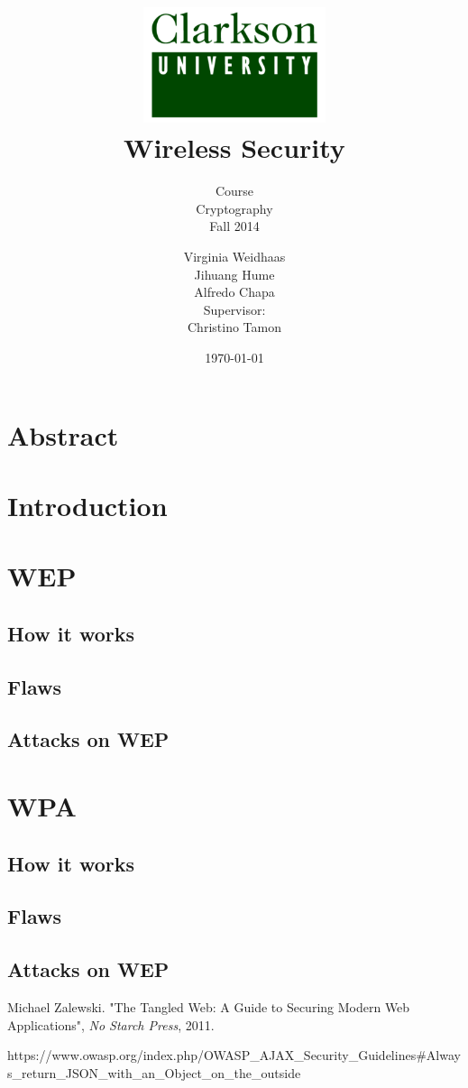 \documentclass[a4paper,12pt,pagesize,headsepline,bibtotoc,titlepage]{scrartcl}
\title{
	\includegraphics*[width=0.4\textwidth]{clarkson.png}\\
	\vspace{24pt}
	Wireless Security
}
\subtitle{
	Course\\
	Cryptography\\
	Fall 2014
}
\author{
	Virginia Weidhaas\\[12pt]
    Jihuang Hume\\[12pt]
	Alfredo Chapa\\[12pt]	
	Supervisor:\\
	Christino Tamon
}
\date{\today}
\begin{document}
\maketitle
\tableofcontents
\newpage
\section{Abstract}
\section{Introduction}
\newpage
\section{WEP}

\subsection{How it works}
\subsection{Flaws}
\subsection{Attacks on WEP}

\newpage
\section{WPA}
\subsection{How it works}
\subsection{Flaws}
\subsection{Attacks on WEP}
\newpage





\newpage


\begin{thebibliography}{1}
Michael Zalewski.
"The Tangled Web: A Guide to Securing Modern Web Applications",
\emph{No Starch Press},
 2011.

https://www.owasp.org/index.php/OWASP_AJAX_Security_Guidelines\#Always_return_JSON_with_an_Object_on_the_outside


\end{thebibliography}
\end{document}
